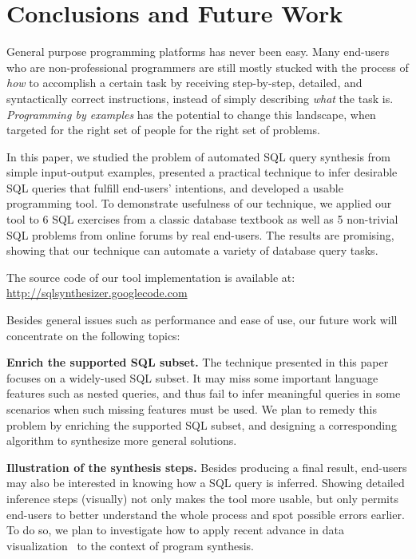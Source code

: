 \section{Conclusions and Future Work}
\label{sec:conclusion}

General purpose programming platforms has never been easy. Many end-users
who are non-professional programmers are still mostly stucked with the process
of \textit{how} to accomplish a certain task by receiving 
step-by-step, detailed, and syntactically correct instructions, instead of simply describing
\textit{what} the task is. \textit{Programming by examples} has the potential
to change this landscape, when targeted for the right set of people for the
right set of problems.

In this paper, we studied the problem of automated SQL query synthesis
from simple input-output examples, presented a practical technique to 
infer desirable SQL queries that fulfill end-users' intentions, and
developed a usable programming tool.
To demonstrate usefulness of our technique, we applied our tool
to 6 SQL exercises from a classic database textbook as well as
5 non-trivial SQL problems from online forums by real end-users. 
The results are promising, showing that our technique can automate a variety of database
query tasks.

The source code of our tool implementation is available at: \\
\url{http://sqlsynthesizer.googlecode.com}

\vspace{1mm}

Besides general issues such as performance and ease of use, our future
work will concentrate on the following topics:

\textbf{Enrich the supported SQL subset.} The technique 
presented in this paper focuses on a widely-used SQL subset.
It may miss some important language features such as
nested queries, and thus fail to infer meaningful queries
in some scenarios when such missing features must be used.
We plan to remedy this problem by enriching the
supported SQL subset, and designing a corresponding algorithm
to synthesize more general solutions.

\textbf{Illustration of the synthesis steps.} Besides
producing a final result, end-users may also be interested in knowing
how a SQL query is inferred.  Showing detailed inference steps (visually) not
only makes the tool more usable, but only permits
end-users to better understand the whole process and spot possible errors earlier.
To do so, we plan to investigate how to apply recent advance in data
visualization~\cite{Kandel:2011}
to the context of program synthesis.

